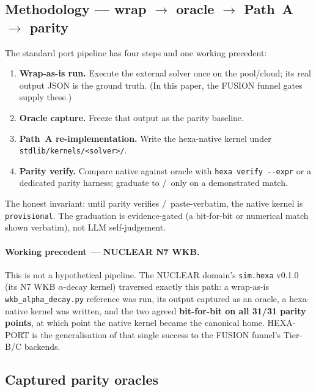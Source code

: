 \subsection{Methodology --- wrap $\rightarrow$ oracle $\rightarrow$
Path~A $\rightarrow$ parity}
\label{app:hexaport:methodology}

The standard port pipeline has four steps and one working precedent:

\begin{enumerate}\itemsep0.3em
\item \textbf{Wrap-as-is run.} Execute the external solver once on the
pool/cloud; its real output JSON is the ground truth. (In this paper,
the FUSION funnel gates supply these.)
\item \textbf{Oracle capture.} Freeze that output as the parity
baseline.
\item \textbf{Path~A re-implementation.} Write the hexa-native kernel
under \texttt{stdlib/kernels/<solver>/}.
\item \textbf{Parity verify.} Compare native against oracle with
\texttt{hexa verify {-}{-}expr} or a dedicated parity harness; graduate
to \tierGreen/\tierBlue\ only on a demonstrated match.
\end{enumerate}

The honest invariant: until parity verifies \tierGreen/\tierBlue\
paste-verbatim, the native kernel is \texttt{provisional}. The
graduation is evidence-gated (a bit-for-bit or numerical match shown
verbatim), not LLM self-judgement.

\paragraph{Working precedent --- NUCLEAR N7 WKB.} This is not a
hypothetical pipeline. The NUCLEAR domain's \texttt{sim.hexa} v0.1.0
(its N7 WKB $\alpha$-decay kernel) traversed exactly this path: a
wrap-as-is \texttt{wkb\_alpha\_decay.py} reference was run, its output
captured as an oracle, a hexa-native kernel was written, and the two
agreed \textbf{bit-for-bit on all 31/31 parity points}, at which point
the native kernel became the canonical home. HEXA-PORT is the
generalisation of that single success to the FUSION funnel's Tier-B/C
backends.

\subsection{Captured parity oracles}
\label{app:hexaport:oracles}

